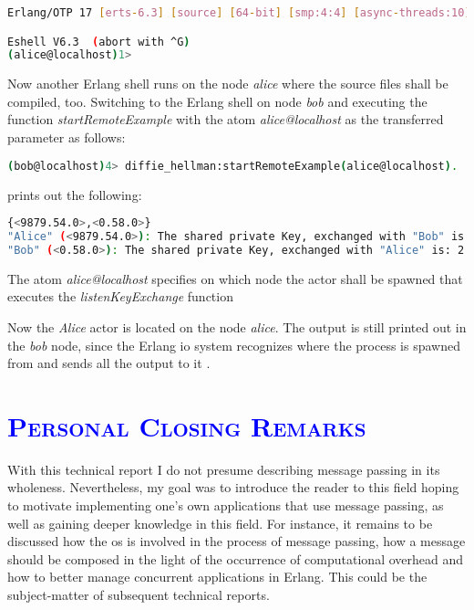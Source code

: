 \documentclass[xcolor=dvipsnames]{article}
\begin{document}
\begin{lstlisting}[language=bash]
Erlang/OTP 17 [erts-6.3] [source] [64-bit] [smp:4:4] [async-threads:10] [hipe] [kernel-poll:false]

Eshell V6.3  (abort with ^G)
(alice@localhost)1>
\end{lstlisting}

\noindent Now another Erlang shell runs on the node \textit{alice} where the source files shall be compiled, too. Switching to the Erlang shell on node \textit{bob} and executing the function \textit{startRemoteExample} with the atom \textit{alice@localhost} as the transferred parameter as follows:

\begin{lstlisting}[language=bash]
(bob@localhost)4> diffie_hellman:startRemoteExample(alice@localhost).
\end{lstlisting}

\noindent prints out the following:

\begin{lstlisting}[language=bash]
{<9879.54.0>,<0.58.0>}
"Alice" (<9879.54.0>): The shared private Key, exchanged with "Bob" is: 2
"Bob" (<0.58.0>): The shared private Key, exchanged with "Alice" is: 2
\end{lstlisting}

\noindent The atom \textit{alice@localhost} specifies on which node the actor shall be spawned that executes the \textit{listenKeyExchange} function

\noindent Now the \textit{Alice} actor is located on the node \textit{alice}. The output is still printed out in the \textit{bob} node, since the Erlang io system recognizes where the process is spawned from and sends all the output to it \cite[ch. 4.3.4 on p. 104]{erl_doc}.

\section{\scshape{\textcolor{blue}{Personal Closing Remarks}}}

\noindent With this technical report I do not presume describing message passing in its wholeness. Nevertheless, my goal was to introduce the reader to this field hoping to motivate implementing one's own applications that use message passing, as well as gaining deeper knowledge in this field. For instance, it remains to be discussed how the \gls{os} is involved in the process of message passing, how a message should be composed in the light of the occurrence of computational overhead and how to better manage concurrent applications in Erlang. This could be the subject-matter of subsequent technical reports.
\end{document}
